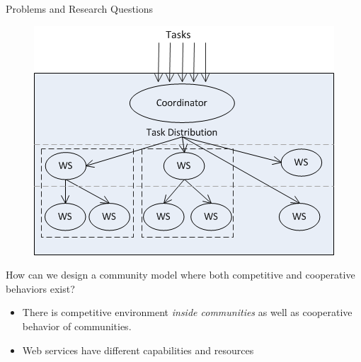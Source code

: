 \documentclass{beamer}
\begin{document}
\begin{frame}{Problems and Research Questions}
    \begin{figure}[h]
        \centering
         \includegraphics[scale=0.5]{figures/rq3.png}
        \label{architectureFigure}
    \end{figure}

    \footnotesize{\colorbox{blue}{\color{white}{R6}} How can we design a community model where both competitive and cooperative behaviors exist?}\\
        \begin{itemize}
            \item There is competitive environment \emph{inside communities} as well as cooperative behavior of communities.
            \item Web services have different capabilities and resources
        \end{itemize}

\end{frame}
\end{document}
